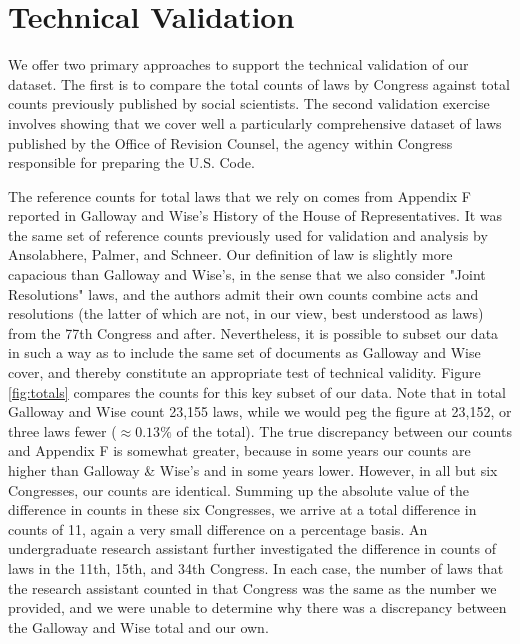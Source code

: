 \documentclass[fleqn,10pt]{wlscirep}
\begin{document}

\section*{Technical Validation}


We offer two primary approaches to support the technical validation of our dataset. The first is to compare the total counts of laws by Congress against total counts previously published by social scientists. The second validation exercise involves showing that we cover well a particularly comprehensive dataset of laws published by the Office of Revision Counsel, the agency within Congress  responsible for preparing the U.S. Code.

The reference counts for total laws that we rely on comes from Appendix F reported in Galloway and Wise's History of the House of Representatives\nocite{gallowaywise}. It was the same set of reference counts previously used for validation and analysis by Ansolabhere, Palmer, and Schneer\cite{ansolabehere_palmer_schneer_2016}. Our definition of law is slightly more capacious than Galloway and Wise's, in the sense that we also consider "Joint Resolutions" laws, and the authors admit their own counts combine acts and resolutions (the latter of which are not, in our view, best understood as laws) from the 77th Congress and after. Nevertheless, it is possible to subset our data in such a way as to include the same set of documents as Galloway and Wise cover, and thereby constitute an appropriate test of technical validity. Figure \ref{fig:totals} compares the counts for this key subset of our data. Note that in total Galloway and Wise count 23,155 laws, while we would peg the figure at 23,152, or three laws fewer ($\approx 0.13\%$ of the total). The true discrepancy between our counts and Appendix F is somewhat greater, because in some years our counts are higher than Galloway \& Wise's and in some years lower. However, in all but six Congresses, our counts are identical. Summing up the absolute value of the difference in counts in these six Congresses, we arrive at a total difference in counts of 11, again a very small difference on a percentage basis. An undergraduate research assistant further investigated the difference in counts of laws in  the 11th, 15th, and 34th Congress. In each case, the number of laws that the research assistant counted in that Congress was the same as the number we provided, and we were unable to determine why there was a discrepancy between the Galloway and Wise total and our own. 
\end{document}
